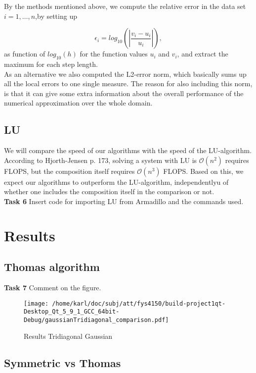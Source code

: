 \documentclass{article}
\begin{document}
By the methods mentioned above, we compute the relative error in the data set $i=1,\dots, n$,by setting up

\[
\epsilon_i=log_{10}\left(\left|\frac{v_i-u_i}
{u_i}\right|\right),
\]
as function of $log_{10}(h)$ for the function values $u_i$ and $v_i$, and extract the maximum for each step length.\\

As an alternative we also computed the L2-error norm, which basically sums up all the local errors to one single measure. The reason for also including this norm, is that it can give some extra information about the overall performance of the numerical approximation over the whole domain.

\subsection{LU}
We will compare the speed of our algorithms with the speed of the LU-algorithm. According to Hjorth-Jensen \cite{MHJ} p. 173, solving a system with LU is $\mathcal{O}(n^2)$ requires FLOPS, but the composition itself requires  $\mathcal{O}(n^3)$ FLOPS. Based on this, we expect our algorithms to outperform the LU-algorithm, independentlyu of whether one includes the composition itself in the comparison or not.\\

\textbf{Task 6} Insert code for importing LU from Armadillo and the commands used.

\section{Results}

\subsection{Thomas algorithm}
\textbf{Task 7} Comment on the figure.

\begin{figure}[H]
	\centering
	\texttt{[image: /home/karl/doc/subj/att/fys4150/build-project1qt-Desktop\_Qt\_5\_9\_1\_GCC\_64bit-Debug/gaussianTridiagonal\_comparison.pdf]}
	\caption{Results Tridiagonal Gaussian}
\end{figure}

\subsection{Symmetric vs Thomas}
\end{document}
